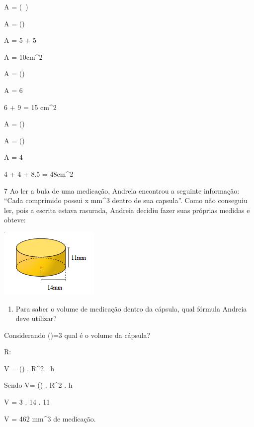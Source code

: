 {A = (\ )

A = ()

A = 5 + 5

A = 10cm^2
\item

A = ()

A = 6

6 + 9 = 15 cm^2
\item

A = ()

A = ()

A = 4

4 + 4 + 8.5 = 48cm^2

\num{7} Ao ler a bula de uma medicação, Andreia encontrou a seguinte
informação: ``Cada comprimido possui x mm^3 dentro de sua capsula''. Como
não conseguiu ler, pois a escrita estava rasurada, Andreia decidiu fazer
suas próprias medidas e obteve:

\includegraphics[width=1.88542in,height=1.3125in]{./imgSAEB_8_MAT/media/image50.png}

\begin{enumerate}
\def\labelenumi{\alph{enumi})}
\tightlist
\item
  Para saber o volume de medicação dentro da cápsula, qual fórmula
  Andreia deve utilizar?
\end{enumerate}
\item Considerando (\Pi)=3 qual é o volume da cápsula?

R:
\item V = (\Pi) . R^2 . h
\item Sendo V= (\Pi) . R^2 . h

V = 3 . 14 . 11

V = 462 mm^3 de medicação.

}
